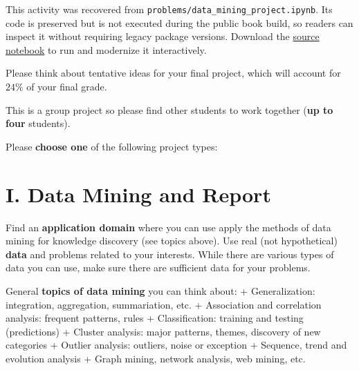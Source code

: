 \documentclass[
  letterpaper,
]{scrbook}
\begin{document}

\begin{tcolorbox}[enhanced jigsaw, arc=.35mm, bottomrule=.15mm, bottomtitle=1mm, breakable, colback=white, colbacktitle=quarto-callout-note-color!10!white, colframe=quarto-callout-note-color-frame, coltitle=black, left=2mm, leftrule=.75mm, opacityback=0, opacitybacktitle=0.6, rightrule=.15mm, title=\textcolor{quarto-callout-note-color}{\faInfo}\hspace{0.5em}{Historical source and execution note}, titlerule=0mm, toprule=.15mm, toptitle=1mm]

This activity was recovered from
\texttt{problems/data\_mining\_project.ipynb}. Its code is preserved but
is not executed during the public book build, so readers can inspect it
without requiring legacy package versions. Download the
\href{../notebooks/data-mining-project.ipynb}{source notebook} to run
and modernize it interactively.

\end{tcolorbox}

Please think about tentative ideas for your final project, which will
account for \(24\%\) of your final grade.

This is a group project so please find other students to work together
(\textbf{up to four} students).

Please \textbf{choose one} of the following project types:

\section*{I. Data Mining and Report}\label{i.-data-mining-and-report}


Find an \textbf{application domain} where you can use apply the methods
of data mining for knowledge discovery (see topics above). Use real (not
hypothetical) \textbf{data} and problems related to your interests.
While there are various types of data you can use, make sure there are
sufficient data for your problems.

General \textbf{topics of data mining} you can think about: +
Generalization: integration, aggregation, summariation, etc. +
Association and correlation analysis: frequent patterns, rules +
Classification: training and testing (predictions) + Cluster analysis:
major patterns, themes, discovery of new categories + Outlier analysis:
outliers, noise or exception + Sequence, trend and evolution analysis +
Graph mining, network analysis, web mining, etc.
\end{document}
